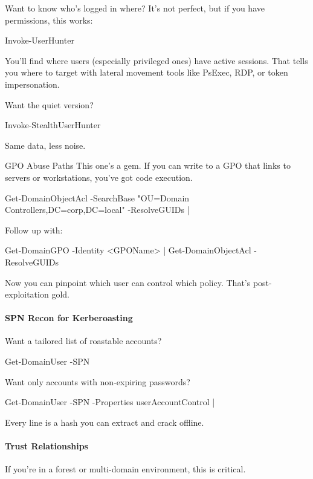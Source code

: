 Want to know who’s logged in where? It’s not perfect, but if you have permissions, this works:

 

 

Invoke-UserHunter

You’ll find where users (especially privileged ones) have active sessions. That tells you where to target with lateral movement tools like PsExec, RDP, or token impersonation.

Want the quiet version?

 

 

Invoke-StealthUserHunter

Same data, less noise.

GPO Abuse Paths
This one’s a gem. If you can write to a GPO that links to servers or workstations, you’ve got code execution.

Get-DomainObjectAcl -SearchBase "OU=Domain Controllers,DC=corp,DC=local" -ResolveGUIDs |


Follow up with:

 

 

Get-DomainGPO -Identity <GPOName> | Get-DomainObjectAcl -ResolveGUIDs

Now you can pinpoint which user can control which policy. That’s post-exploitation gold.

\paragraph{   SPN Recon for Kerberoasting}

Want a tailored list of roastable accounts?


Get-DomainUser -SPN

Want only accounts with non-expiring passwords?

Get-DomainUser -SPN -Properties userAccountControl |

Every line is a hash you can extract and crack offline.

\paragraph{   Trust Relationships}

If you’re in a forest or multi-domain environment, this is critical.


